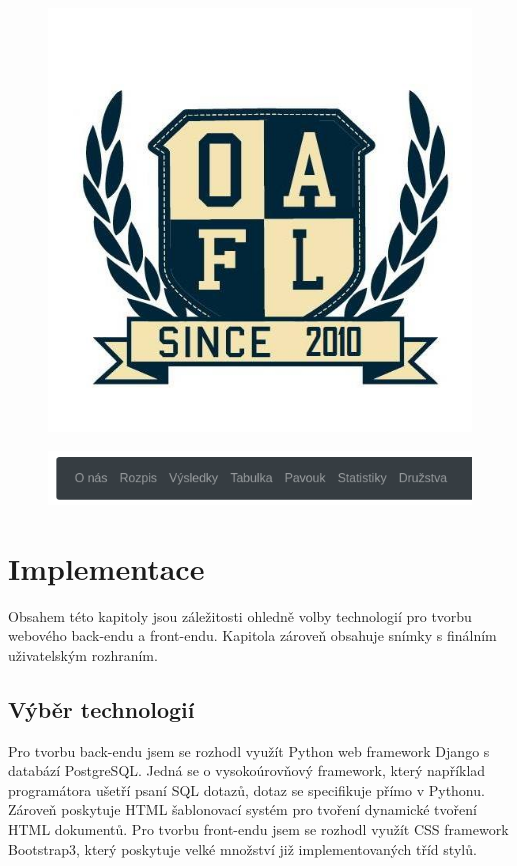 \documentclass[11pt, a4paper, titlepage]{article}
\begin{document}
\begin{figure}[H]
\centering
    \begin{minipage}{.5\textwidth}
        \centering
        \includegraphics[width=.60\textwidth]{images/logo.jpg}
        \label{fig:logo}
    \end{minipage}%
    \begin{minipage}{.5\textwidth}
        \centering
        \includegraphics[width=.99\textwidth]{images/menu.png}
         \label{fig:menu}
    \end{minipage}
\end{figure}


\newpage

\section{Implementace}

Obsahem této kapitoly jsou záležitosti ohledně volby technologií pro tvorbu webového back-endu a front-endu. Kapitola zároveň obsahuje snímky s finálním uživatelským rozhraním.

\subsection{Výběr technologií}

Pro tvorbu back-endu jsem se rozhodl využít Python web framework Django s databází PostgreSQL. Jedná se o vysokoúrovňový framework, který například programátora ušetří psaní SQL dotazů, dotaz se specifikuje přímo v Pythonu. Zároveň poskytuje HTML šablonovací systém pro tvoření dynamické tvoření HTML dokumentů. Pro tvorbu front-endu jsem se rozhodl využít CSS framework Bootstrap3, který poskytuje velké množství již implementovaných tříd stylů.
\end{document}

